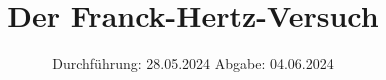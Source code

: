 

\subject{V601}
\title{Der Franck-Hertz-Versuch}
\date{%
  Durchführung: 28.05.2024
  \hspace{3em}
  Abgabe: 04.06.2024
}



\maketitle
\thispagestyle{empty}
\tableofcontents
\newpage






\printbibliography{}
\appendix
\setcounter{secnumdepth}{0}
%
